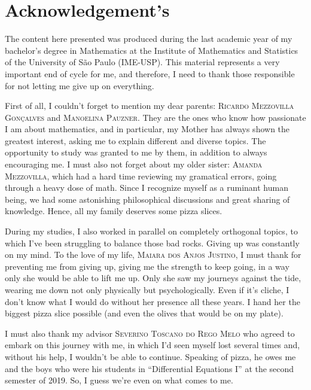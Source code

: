 \thispagestyle{empty}
\chapter*{Acknowledgement's}

The content here presented was produced during the last academic year of my bachelor's degree in Mathematics at the Institute of Mathematics and Statistics of the University of São Paulo (IME-USP). This material represents a very important end of cycle for me, and therefore, I need to thank those responsible for not letting me give up on everything.

First of all, I couldn't forget to mention my dear parents: \textsc{Ricardo Mezzovilla Gonçalves} and \textsc{Manoelina Pauzner}. They are the ones who know how passionate I am about mathematics, and in particular, my Mother has always shown the greatest interest, asking me to explain different and diverse topics. The opportunity to study was granted to me by them, in addition to always encouraging me. I must also not forget about my older sister: \textsc{Amanda Mezzovilla}, which had a hard time reviewing my gramatical errors, going through a heavy dose of math. Since I recognize myself as a ruminant human being, we had some astonishing philosophical discussions and great sharing of knowledge. Hence, all my family deserves some pizza slices.

During my studies, I also worked in parallel on completely orthogonal topics, to which I've been struggling to balance those bad rocks. Giving up was constantly on my mind. To the love of my life, \textsc{Maiara dos Anjos Justino}, I must thank for preventing me from giving up, giving me the strength to keep going, in a way only she would be able to lift me up. Only she saw my journeys against the tide, wearing me down not only physically but psychologically. Even if it's cliche, I don't know what I would do without her presence all these years. I hand her the biggest pizza slice possible (and even the olives that would be on my plate).

I must also thank my advisor \textsc{Severino Toscano do Rego Melo} who agreed to embark on this journey with me, in which I'd seen myself lost several times and, without his help, I wouldn't be able to continue. Speaking of pizza, he owes me and the boys who were his students in ``Differential Equations I'' at the second semester of 2019. So, I guess we're even on what comes to me.

